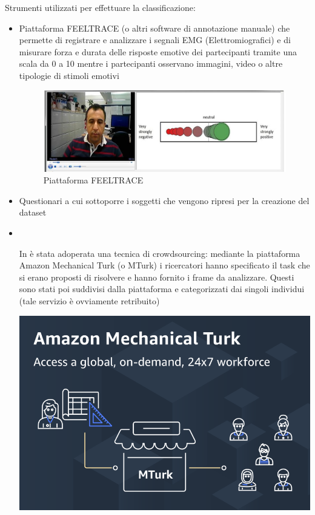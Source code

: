 Strumenti utilizzati per effettuare la classificazione:
\begin{itemize}
    \item Piattaforma FEELTRACE (o altri software di annotazione manuale) che permette di registrare e analizzare i segnali EMG (Elettromiografici) e di misurare forza e durata delle risposte emotive dei partecipanti tramite una scala da 0 a 10 mentre i partecipanti osservano immagini, video o altre tipologie di stimoli emotivi \cite{AFEWVAdatabaseInTheWild}
    \begin{figure}[h]
        \centering    
            \includegraphics[width=0.5\linewidth]{images/11.jpg}
            \caption{Piattaforma FEELTRACE}
    \end{figure}
    \item Questionari a cui sottoporre i soggetti che vengono ripresi per la creazione del dataset
        \item \mbox{}\\[-\baselineskip]
        \begin{minipage}[t]{0.6\textwidth}
            In \cite{DAiSEE} è stata adoperata una tecnica di crowdsourcing: mediante la piattaforma Amazon Mechanical Turk (o MTurk) i ricercatori hanno specificato il task che si erano proposti di risolvere e hanno fornito i frame da analizzare. Questi sono stati poi suddivisi dalla piattaforma e categorizzati dai singoli individui (tale servizio è ovviamente retribuito)
        \end{minipage}\hfill
        \begin{minipage}[t]{0.3\textwidth}
            \centering
            \vspace{0pt}
            \includegraphics[width=\textwidth]{images/12.png}
        \end{minipage}
\end{itemize}


